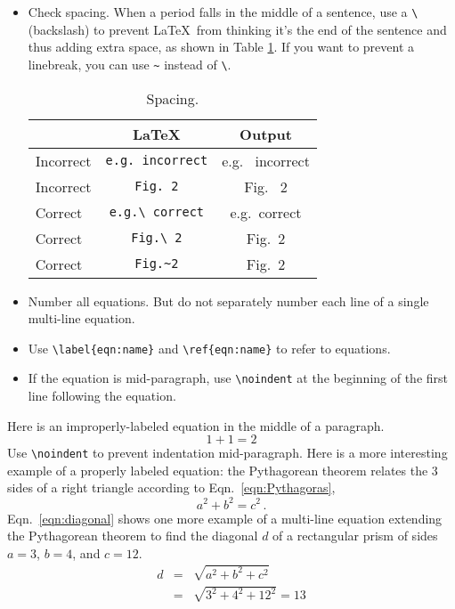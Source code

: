 \begin{itemize}[label=$\Box$]
\item Check spacing. When a period falls in the middle of a sentence, use a {\tt \textbackslash} (backslash) to prevent \LaTeX\ from thinking it's the end of the sentence and thus adding extra space, as shown in Table \ref{tab:spacing}. If you want to prevent a linebreak, you can use {\tt \textasciitilde} instead of {\tt \textbackslash}.
\begin{table}[h!]
  \begin{center}
    \caption{Spacing.}
    \label{tab:spacing}
    \begin{tabular}{l|c|c} %
      \hline
       & \LaTeX & Output \\
      \hline \hline
      Incorrect & {\tt e.g.\ incorrect} & e.g. \ incorrect \\
      Incorrect & {\tt Fig.\ 2} & Fig. \ 2 \\
      Correct & {\tt e.g.\textbackslash\ correct} & e.g.\ correct \\
      Correct & {\tt Fig.\textbackslash\ 2} & Fig.\ 2 \\
      Correct & {\tt Fig.\textasciitilde 2} & Fig.~2 \\
      \hline
    \end{tabular}
  \end{center}
\end{table}

\item Number all equations. But do not separately number each line of a single multi-line equation.
\item Use {\tt \textbackslash label\{eqn:name\}} and {\tt \textbackslash ref\{eqn:name\}} to refer to equations.
\item If the equation is mid-paragraph, use {\tt \textbackslash noindent} at the beginning of the first line following the equation.
\end{itemize}
\vspace{2mm}

 Here is an improperly-labeled equation in the middle of a paragraph.
\[
1+1=2
\]
\noindent Use {\tt \textbackslash noindent} to prevent indentation mid-paragraph. Here is a more interesting example of a properly labeled equation: the Pythagorean theorem relates the 3 sides of a right triangle according to Eqn.\ \ref{eqn:Pythagoras},
\begin{equation}
a^2+b^2=c^2 \,.
\label{eqn:Pythagoras}
\end{equation}
\noindent Eqn.\ \ref{eqn:diagonal} shows one more example of a multi-line equation extending the Pythagorean theorem to find the diagonal $d$ of a rectangular prism of sides $a=3$, $b=4$, and $c=12$.
\begin{eqnarray}
\label{eqn:diagonal}
\nonumber d & = & \sqrt{a^2 + b^2 + c^2} \\
& = & \sqrt{3^2+4^2+12^2} = 13
\end{eqnarray}